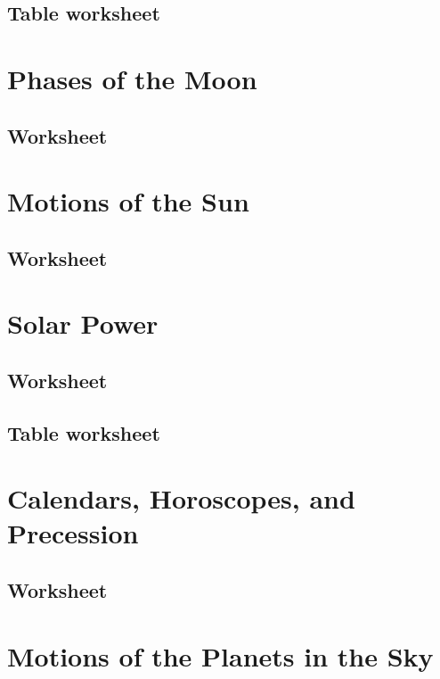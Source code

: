 \documentclass[12pt]{article}
\begin{document}
\subsection{Table worksheet}\label{apx:lab_03_tb}


\newpage
\section{Phases of the Moon}\label{apx:lab_04}
\subsection{Worksheet}\label{apx:lab_04_ws}


\newpage
\section{Motions of the Sun}\label{apx:lab_05}
\subsection{Worksheet}\label{apx:lab_05_ws}


\newpage
\section{Solar Power}\label{apx:lab_06}
\subsection{Worksheet}\label{apx:lab_06_ws}

\newpage
\subsection{Table worksheet}\label{apx:lab_06_tb}


\newpage
\section{Calendars, Horoscopes, and Precession}\label{apx:lab_07}
\subsection{Worksheet}\label{apx:lab_07_ws}


\newpage
\section{Motions of the Planets in the Sky}\label{apx:lab_08}
\end{document}
